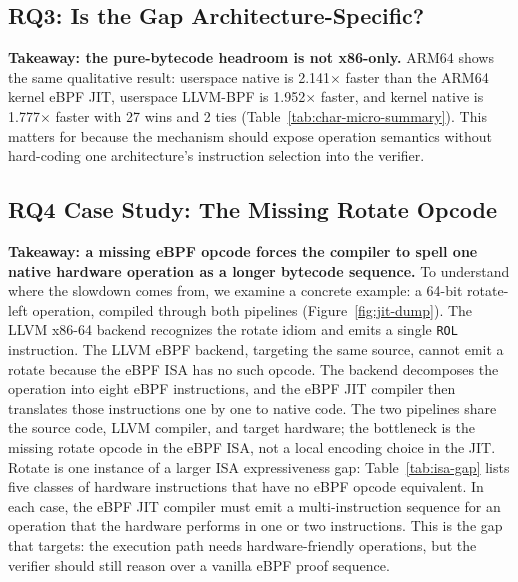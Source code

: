 

\subsection{RQ3: Is the Gap Architecture-Specific?}
\label{subsec:char-portability}

\noindent\textbf{Takeaway: the pure-bytecode headroom is not x86-only.}
ARM64 shows the same qualitative result: userspace native is 2.141$\times$
faster than the ARM64 kernel eBPF JIT, userspace LLVM-BPF is 1.952$\times$
faster, and kernel native is 1.777$\times$ faster with 27 wins and 2 ties
(Table~\ref{tab:char-micro-summary}). This matters for \lang because the
mechanism should expose operation semantics without hard-coding one
architecture's instruction selection into the verifier.

\subsection{RQ4 Case Study: The Missing Rotate Opcode}
\label{subsec:char-rotate}

\noindent\textbf{Takeaway: a missing eBPF opcode forces the compiler to spell
one native hardware operation as a longer bytecode sequence.}
To understand where the slowdown comes from, we examine a concrete example: a
64-bit rotate-left operation, compiled through both pipelines
(Figure~\ref{fig:jit-dump}). The LLVM x86-64 backend recognizes the rotate
idiom and emits a single \texttt{ROL} instruction. The LLVM eBPF backend,
targeting the same source, cannot emit a rotate because the eBPF ISA has no
such opcode. The backend decomposes the operation into eight eBPF instructions,
and the eBPF JIT compiler then translates those instructions one by one to
native code. The two pipelines share the source code, LLVM compiler, and target
hardware; the bottleneck is the missing rotate opcode in the eBPF ISA, not a
local encoding choice in the JIT. Rotate is one instance of a larger ISA
expressiveness gap: Table~\ref{tab:isa-gap} lists five classes of hardware
instructions that have no eBPF opcode equivalent. In each case, the eBPF JIT
compiler must emit a multi-instruction sequence for an operation that the
hardware performs in one or two instructions. This is the gap that \lang
targets: the execution path needs hardware-friendly operations, but the
verifier should still reason over a vanilla eBPF proof sequence.




